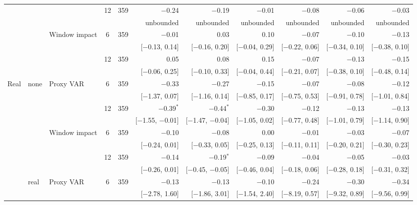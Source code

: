 \begin{longtable}{lllcrrrrrrr}
 &  &  & 12 & 359 & $-$0.24 & $-$0.19 & $-$0.01 & $-$0.08 & $-$0.06 & $-$0.03\\
 & & & & & {\tiny unbounded} & {\tiny unbounded} & {\tiny unbounded} & {\tiny unbounded} & {\tiny unbounded} & {\tiny unbounded}\\
 &  & Window impact & 6 & 359 & $-$0.01 & 0.03 & 0.10 & $-$0.07 & $-$0.10 & $-$0.13\\
 & & & & & {\tiny [$-$0.13, 0.14]} & {\tiny [$-$0.16, 0.20]} & {\tiny [$-$0.04, 0.29]} & {\tiny [$-$0.22, 0.06]} & {\tiny [$-$0.34, 0.10]} & {\tiny [$-$0.38, 0.10]}\\
 &  &  & 12 & 359 & 0.05 & 0.08 & 0.15 & $-$0.07 & $-$0.13 & $-$0.15\\
 & & & & & {\tiny [$-$0.06, 0.25]} & {\tiny [$-$0.10, 0.33]} & {\tiny [$-$0.04, 0.44]} & {\tiny [$-$0.21, 0.07]} & {\tiny [$-$0.38, 0.10]} & {\tiny [$-$0.48, 0.14]}\\
\addlinespace
Real & none & Proxy VAR & 6 & 359 & $-$0.33 & $-$0.27 & $-$0.15 & $-$0.07 & $-$0.08 & $-$0.12\\
 & & & & & {\tiny [$-$1.37, 0.07]} & {\tiny [$-$1.16, 0.14]} & {\tiny [$-$0.85, 0.17]} & {\tiny [$-$0.75, 0.53]} & {\tiny [$-$0.91, 0.78]} & {\tiny [$-$1.01, 0.84]}\\
 &  &  & 12 & 359 & $-$0.39$^{*}$ & $-$0.44$^{*}$ & $-$0.30 & $-$0.12 & $-$0.13 & $-$0.13\\
 & & & & & {\tiny [$-$1.55, $-$0.01]} & {\tiny [$-$1.47, $-$0.04]} & {\tiny [$-$1.05, 0.02]} & {\tiny [$-$0.77, 0.48]} & {\tiny [$-$1.01, 0.79]} & {\tiny [$-$1.14, 0.90]}\\
 &  & Window impact & 6 & 359 & $-$0.10 & $-$0.08 & 0.00 & $-$0.01 & $-$0.03 & $-$0.07\\
 & & & & & {\tiny [$-$0.24, 0.01]} & {\tiny [$-$0.33, 0.05]} & {\tiny [$-$0.25, 0.13]} & {\tiny [$-$0.11, 0.11]} & {\tiny [$-$0.20, 0.21]} & {\tiny [$-$0.30, 0.23]}\\
 &  &  & 12 & 359 & $-$0.14 & $-$0.19$^{*}$ & $-$0.09 & $-$0.04 & $-$0.05 & $-$0.03\\
 & & & & & {\tiny [$-$0.26, 0.01]} & {\tiny [$-$0.45, $-$0.05]} & {\tiny [$-$0.46, 0.04]} & {\tiny [$-$0.18, 0.06]} & {\tiny [$-$0.28, 0.18]} & {\tiny [$-$0.31, 0.32]}\\
 & real & Proxy VAR & 6 & 359 & $-$0.13 & $-$0.13 & $-$0.10 & $-$0.24 & $-$0.30 & $-$0.34\\
 & & & & & {\tiny [$-$2.78, 1.60]} & {\tiny [$-$1.86, 3.01]} & {\tiny [$-$1.54, 2.40]} & {\tiny [$-$8.19, 0.57]} & {\tiny [$-$9.32, 0.89]} & {\tiny [$-$9.56, 0.99]}\\

\end{longtable}
